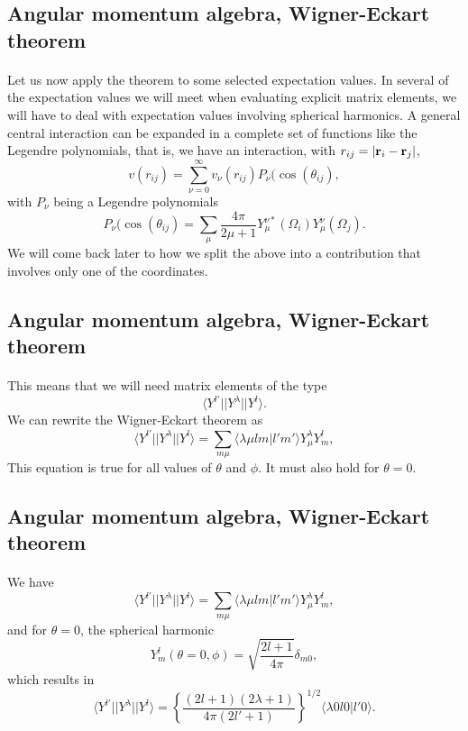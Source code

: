 \documentclass[%
twoside,                 %
final,                   %
10pt]{article}
\begin{document}
\subsection*{Angular momentum algebra, Wigner-Eckart theorem}

\paragraph{}
Let us now apply the theorem to some selected expectation values.
In several of the expectation values we will meet when evaluating explicit matrix elements, we will have to deal with expectation values involving spherical harmonics. A general central interaction can be expanded in a complete set of functions like the Legendre polynomials, that is, we have an interaction, with $r_{ij}=|{\bf r}_i-{\bf r}_j|$,
\[
v(r_{ij})=\sum_{\nu=0}^{\infty}v_{\nu}(r_{ij})P_{\nu}(\cos{(\theta_{ij})},
\]
with $P_{\nu}$ being a Legendre polynomials
\[
P_{\nu}(\cos{(\theta_{ij})}=\sum_{\mu}\frac{4\pi}{2\mu+1}Y_{\mu}^{\nu *}(\Omega_{i})Y_{\mu}^{\nu}(\Omega_{j}).
\]
We will come back later to how we split the above into a contribution that involves only one of the coordinates.


\subsection*{Angular momentum algebra, Wigner-Eckart theorem}

\paragraph{}
This means that we will need matrix elements of the type
\[
\langle Y^{l'}||Y^{\lambda}|| Y^{l}\rangle.
\]
We can rewrite the Wigner-Eckart theorem as 
\[
\langle Y^{l'}||Y^{\lambda}|| Y^{l}\rangle=\sum_{m\mu}\langle \lambda\mu lm|l'm'\rangle Y^{\lambda}_{\mu}Y^l_m,
\]
This equation is true for all values of $\theta$ and $\phi$. It must also hold for $\theta=0$.


\subsection*{Angular momentum algebra, Wigner-Eckart theorem}

\paragraph{}
We have 
\[
\langle Y^{l'}||Y^{\lambda}|| Y^{l}\rangle=\sum_{m\mu}\langle \lambda\mu lm|l'm'\rangle Y^{\lambda}_{\mu}Y^l_m,
\]
and for $\theta=0$, the spherical harmonic
\[
Y_m^l(\theta=0,\phi)=\sqrt{\frac{2l+1}{4\pi}}\delta_{m0}, 
\]
which results in 
\[
\langle Y^{l'}||Y^{\lambda}|| Y^{l}\rangle=\left\{\frac{(2l+1)(2\lambda+1)}{4\pi(2l'+1)}\right\}^{1/2}\langle \lambda0 l0|l'0\rangle.
\]
\end{document}
